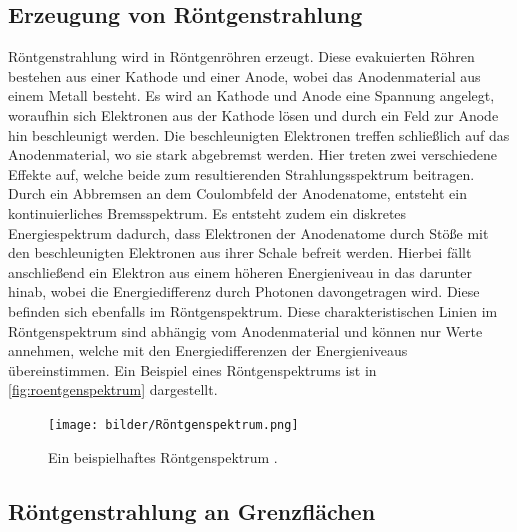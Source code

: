 \subsection{Erzeugung von Röntgenstrahlung}
Röntgenstrahlung wird in Röntgenröhren erzeugt. Diese evakuierten Röhren bestehen aus einer Kathode und einer Anode, wobei das Anodenmaterial aus einem Metall besteht. 
Es wird an Kathode und Anode eine Spannung angelegt, woraufhin sich Elektronen aus der Kathode lösen und durch ein Feld zur Anode hin beschleunigt werden. Die 
beschleunigten Elektronen treffen schließlich auf das Anodenmaterial, wo sie stark abgebremst werden. Hier treten zwei verschiedene Effekte auf, welche beide
zum resultierenden Strahlungsspektrum beitragen.\\
Durch ein Abbremsen an dem Coulombfeld der Anodenatome, entsteht ein kontinuierliches Bremsspektrum. Es entsteht zudem ein diskretes Energiespektrum dadurch,
dass Elektronen der Anodenatome durch Stöße mit den beschleunigten Elektronen aus ihrer Schale befreit werden. Hierbei fällt anschließend ein Elektron aus einem
höheren Energieniveau in das darunter hinab, wobei die Energiedifferenz durch Photonen davongetragen wird. Diese befinden sich ebenfalls im Röntgenspektrum.
Diese charakteristischen Linien im Röntgenspektrum sind abhängig vom Anodenmaterial und können nur Werte annehmen, welche mit den Energiedifferenzen der Energieniveaus
übereinstimmen. Ein Beispiel eines Röntgenspektrums ist in \autoref{fig:roentgenspektrum} dargestellt.
\begin{figure}
    \centering
    \texttt{[image: bilder/Röntgenspektrum.png]}
    \caption{Ein beispielhaftes Röntgenspektrum \cite{Uni_Goett}.}
    \label{fig:roentgenspektrum}
\end{figure}

\subsection{Röntgenstrahlung an Grenzflächen}

